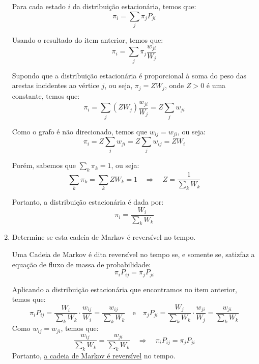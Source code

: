 \begin{enumerate}
\begin{resposta}
        Para cada estado $i$ da distribuição estacionária, temos que:
        $$ \pi_i = \sum_{j} \pi_j P_{ji} $$

        Usando o resultado do item anterior, temos que:
        $$ \pi_i = \sum_{j} \pi_j \frac{w_{ji}}{W_j} $$

        Supondo que a distribuição estacionária é proporcional à soma do peso das arestas incidentes ao vértice $j$, ou seja, $\pi_j = Z W_j$, onde $Z>0$ é uma constante, temos que:
        $$ \pi_i = \sum_{j} (Z W_j) \frac{w_{ji}}{W_j} = Z \sum_{j} w_{ji}$$

        Como o grafo é não direcionado, temos que $w_{ij} = w_{ji}$, ou seja:
        $$ \pi_i = Z \sum_{j} w_{ji} = Z \sum_{j} w_{ij} = Z W_i $$

        Porém, sabemos que $\sum_{k} \pi_k = 1$, ou seja:
        $$ \sum_{k} \pi_k = \sum_{k} Z W_k = 1 \quad \Rightarrow \quad Z = \frac{1}{\sum_{k} W_k}$$
    
        Portanto, a distribuição estacionária é dada por:
        $$ \boxed{\pi_i = \frac{W_i}{\sum_{k} W_k}} $$


    \end{resposta}
    \item Determine se esta cadeia de Markov é reversível no tempo.
    \begin{resposta}
        Uma Cadeia de Markov é dita reversível no tempo se, e somente se, satizfaz a equação de fluxo de massa de probabilidade:
        $$ \pi_i P_{ij} = \pi_j P_{ji} $$

        Aplicando a distribuição estacionária que encontramos no item anterior, temos que:
        $$ \pi_i P_{ij} = \frac{W_i}{\sum_{k} W_k} \cdot \frac{w_{ij}}{W_i} = \frac{w_{ij}}{\sum_{k} W_k}  \quad \text{e} \quad \pi_j P_{ji} = \frac{W_j}{\sum_{k} W_k} \cdot \frac{w_{ji}}{W_j} = \frac{w_{ji}}{\sum_{k} W_k}$$
        Como $w_{ij} = w_{ji}$, temos que:
        $$ \frac{w_{ij}}{\sum_{k} W_k} = \frac{w_{ji}}{\sum_{k} W_k} \quad \Rightarrow \quad \boxed{\pi_i P_{ij} = \pi_j P_{ji}} $$
        Portanto, \underline{a cadeia de Markov é reversível} no tempo.
    \end{resposta}
\end{enumerate}
